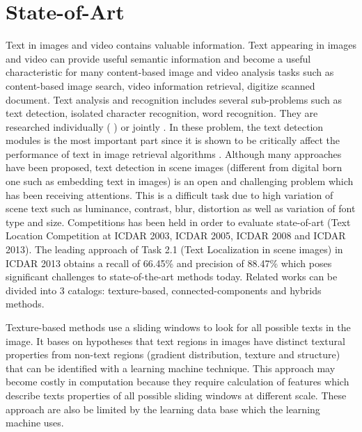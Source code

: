 
\graphicspath{ {1chapterStateOfArt/image/} }
\chapter{State-of-Art} \label{State-of-Art}

\par
Text in images and video contains valuable information. Text appearing in images and video can provide useful semantic information and become a useful characteristic for many content-based image and video analysis tasks such as content-based image search, video information retrieval, digitize scanned document. Text analysis and recognition includes several sub-problems such as text detection, isolated character recognition, word recognition. They are researched individually (\cite{Campos.2010.CVPR} \cite{Chen.2004.CVPR} \cite{Liu.2006.CRA} \cite{Epshtein.2010.CVPR} \cite{xucheng.2013.pami}) or jointly \cite{Neumann12}. In these problem, the text detection modules is the most important part since it is shown to be critically affect the performance of text in image retrieval algorithms \cite{Epshtein.2010.CVPR}. Although many approaches have been proposed, text detection in scene images (different from digital born one such as embedding text in images) is an open and challenging problem which has been receiving attentions. This is a difficult task due to high variation of scene text such as luminance, contrast, blur, distortion as well as variation of font type and size. Competitions has been held in order to evaluate state-of-art (Text Location Competition at ICDAR 2003, ICDAR 2005, ICDAR 2008 and ICDAR 2013). The leading approach of Task 2.1 (Text Localization in scene images) in ICDAR 2013 obtains a recall of 66.45\% and precision of 88.47\% \cite{ICDAR.2013} which poses significant challenges to state-of-the-art methods today. Related works can be divided into 3 catalogs: texture-based, connected-components and hybrids methods. 
\par
Texture-based methods \cite{Chen.2004.CVPR}  use a sliding windows to look for all possible texts in the image. It bases on hypotheses that text regions in images have distinct textural properties from non-text regions (gradient distribution, texture and structure) that can be identified with a learning machine technique. This approach may become costly in computation because they require calculation of features which describe texts properties of all possible sliding windows at different scale. These approach are also be limited by the learning data base which the learning machine uses. 
